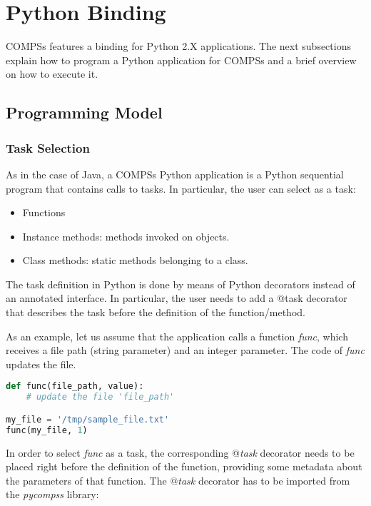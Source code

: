 \section{Python Binding}
\label{sec:Python}

COMPSs features a binding for Python 2.X applications. The next subsections explain how to program a Python 
application for COMPSs and a brief overview on how to execute it.

\subsection{Programming Model}

\subsubsection{Task Selection}

As in the case of Java, a COMPSs Python application is a Python sequential program that contains calls to tasks. 
In particular, the user can select as a task:

\begin{itemize}
 \item Functions
 \item Instance methods: methods invoked on objects.
 \item Class methods: static methods belonging to a class.
\end{itemize}

The task definition in Python is done by means of Python decorators instead of an annotated interface. 
In particular, the user needs to add a $@$task decorator that describes the task before the definition of the function/method.

As an example, let us assume that the application calls a function \textit{func}, which receives a file path (string parameter) 
and an integer parameter. The code of \textit{func} updates the file.

\begin{lstlisting}[language=python]
def func(file_path, value):
    # update the file 'file_path'

my_file = '/tmp/sample_file.txt'
func(my_file, 1)
\end{lstlisting}

In order to select {\it func} as a task, the corresponding {\it $@$task} decorator needs to be placed right 
before the definition of the function, providing some metadata about the parameters of that function. 
The {\it $@$task} decorator has to be imported from the {\it pycompss} library:

